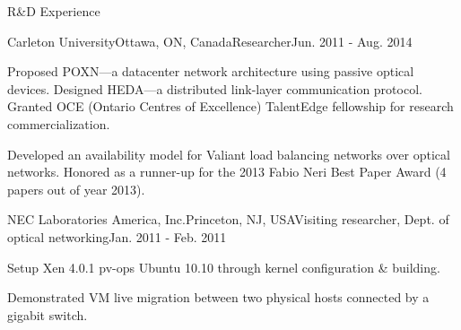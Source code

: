 \documentclass{resume} %
\begin{document}
\begin{rSection}{R\&D Experience}

\begin{rSubsection}{Carleton University}{Ottawa, ON, Canada}{Researcher}{Jun. 2011 - Aug. 2014}
\item Proposed POXN---a datacenter network architecture using passive optical devices. Designed HEDA---a distributed link-layer communication protocol. Granted OCE (Ontario Centres of Excellence) TalentEdge fellowship for research commercialization. %
\item Developed an availability model for Valiant load balancing networks over optical networks. Honored as a runner-up for the 2013 Fabio Neri Best Paper Award (4 papers out of year 2013).
\end{rSubsection}


\begin{rSubsection}{NEC Laboratories America, Inc.}{Princeton, NJ, USA}{Visiting researcher, Dept. of optical networking}{Jan. 2011 - Feb. 2011}
\item Setup Xen 4.0.1 pv-ops Ubuntu 10.10 through kernel configuration \& building. 
\item Demonstrated VM live migration between two physical hosts connected by a gigabit switch.
\end{rSubsection}

\end{rSection}



\end{document}

